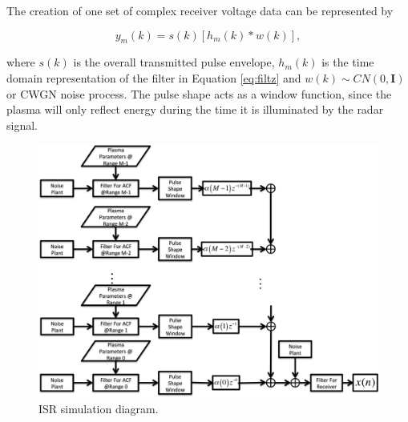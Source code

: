 \documentclass[draft,ras]{agutex}
\begin{document}
\begin{article}
The creation of one set of complex receiver voltage data can be represented by

\begin{equation}
\label{eq2}
y_m (k)= s(k)\left[h_m(k)*w(k)\right],
\end{equation}
 
\noindent where $s(k)$ is the overall transmitted pulse envelope, $h_m(k)$ is the time domain representation of the filter in Equation \ref{eq:filtz} and $w(k)\sim CN(0,\mathbf{I})$ or CWGN noise process. The pulse shape acts as a window function, since the plasma will only reflect energy during the time it is illuminated by the radar signal. 

%

\begin{figure}[!h]
\centering
\includegraphics[width=7.0in]{diagram}
\caption{ISR simulation diagram.}
\label{fig:isrdiag}
\end{figure}


\end{article}
\end{document}
